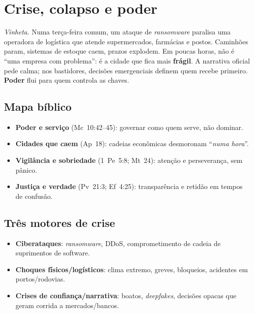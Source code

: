 \chapter{Crise, colapso e poder}
\noindent\textit{Vinheta.} Numa terça-feira comum, um ataque de \emph{ransomware} paralisa uma operadora de logística que atende supermercados, farmácias e postos. Caminhões param, sistemas de estoque caem, prazos explodem. Em poucas horas, não é ``uma empresa com problema'': é a cidade que fica mais \textbf{frágil}. A narrativa oficial pede calma; nos bastidores, decisões emergenciais definem quem recebe primeiro. \textbf{Poder} flui para quem controla as chaves.

\section{Mapa bíblico}
\begin{itemize}[leftmargin=*,noitemsep]
  \item \textbf{Poder e serviço} (Mc~10:42--45): governar como quem serve, não dominar.
  \item \textbf{Cidades que caem} (Ap~18): cadeias econômicas desmoronam ``\emph{numa hora}''.
  \item \textbf{Vigilância e sobriedade} (1~Pe~5:8; Mt~24): atenção e perseverança, sem pânico.
  \item \textbf{Justiça e verdade} (Pv~21:3; Ef~4:25): transparência e retidão em tempos de confusão.
\end{itemize}

\section{Três motores de crise}
\begin{itemize}[leftmargin=*,noitemsep]
  \item \textbf{Ciberataques}: \emph{ransomware}, DDoS, comprometimento de cadeia de suprimentos de software.
  \item \textbf{Choques físicos/logísticos}: clima extremo, greves, bloqueios, acidentes em portos/rodovias.
  \item \textbf{Crises de confiança/narrativa}: boatos, \emph{deepfakes}, decisões opacas que geram corrida a mercados/bancos.
\end{itemize}

